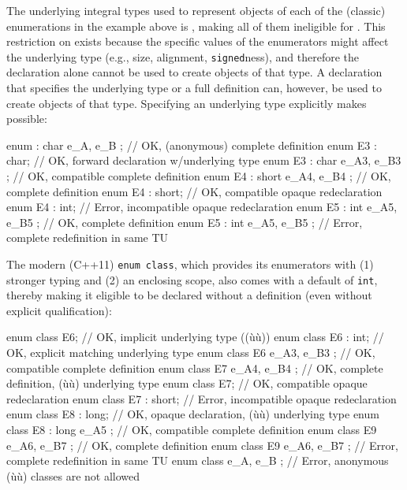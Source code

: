 \noindent The underlying integral types used to represent objects of each of the
(classic) enumerations in the example above is , making
all of them ineligible for . This restriction
on  exists because the specific values of
the enumerators might affect the underlying type %
(e.g.,
size, alignment, \lstinline!signed!ness), and therefore the declaration
alone cannot be used to create objects of that type. A declaration that
specifies the underlying type or a full definition can, however, be used
to create objects of that type. Specifying an underlying
type %
explicitly makes  possible:

\begin{emcppslisting}[emcppsbatch=e1]
enum    : char { e_A, e_B };     // OK, (anonymous) complete definition
enum E3 : char;                  // OK, forward declaration w/underlying type
enum E3 : char { e_A3, e_B3 };   // OK, compatible complete definition
enum E4 : short { e_A4, e_B4 };  // OK, complete definition
enum E4 : short;                 // OK, compatible opaque redeclaration
enum E4 : int;                   // Error, incompatible opaque redeclaration
enum E5 : int { e_A5, e_B5 };    // OK, complete definition
enum E5 : int { e_A5, e_B5 };    // Error, complete redefinition in same TU
\end{emcppslisting}

\noindent The modern (C++11) \lstinline!enum!~\lstinline!class!, %
which
provides its enumerators with (1) stronger typing and (2) an enclosing
scope, also comes with a default  of
\lstinline!int!, thereby making it eligible to be declared without a
definition (even without explicit qualification):

\begin{emcppslisting}[emcppsbatch=e1]
enum class E6;                 // OK, implicit underlying type ((ù{}ù))
enum class E6 : int;           // OK, explicit matching underlying type
enum class E6 { e_A3, e_B3 };  // OK, compatible complete definition
enum class E7 { e_A4, e_B4 };  // OK, complete definition, (ù{}ù) underlying type
enum class E7;                 // OK, compatible opaque redeclaration
enum class E7 : short;         // Error, incompatible opaque redeclaration
enum class E8 : long;          // OK, opaque declaration, (ù{}ù) underlying type
enum class E8 : long { e_A5 }; // OK, compatible complete definition
enum class E9 { e_A6, e_B7 };  // OK, complete definition
enum class E9 { e_A6, e_B7 };  // Error, complete redefinition in same TU
enum class    { e_A, e_B };    // Error, anonymous (ù{}ù) classes are not allowed
\end{emcppslisting}

